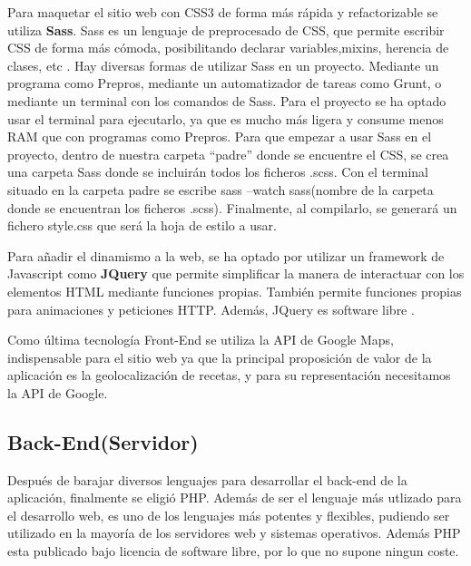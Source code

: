 \vspace{5 mm}

Para maquetar el sitio web con CSS3 de forma más rápida y refactorizable se utiliza \textbf{Sass}. Sass es un lenguaje de preprocesado de CSS, que permite
escribir CSS de forma más cómoda, posibilitando declarar variables,mixins, herencia de clases, etc \cite{sass-doc}. Hay diversas formas de utilizar Sass
en un proyecto. Mediante un programa como Prepros, mediante un automatizador de tareas como Grunt, o mediante un terminal con los comandos de Sass.
Para el proyecto se ha optado usar el terminal para ejecutarlo, ya que es mucho más ligera y consume menos RAM que con programas como Prepros.
Para que empezar a usar Sass en el proyecto, dentro de nuestra carpeta ``padre'' donde se encuentre el CSS, se crea una carpeta Sass donde se incluirán
todos los ficheros .scss. Con el terminal situado en la carpeta padre se escribe sass --watch sass(nombre de la carpeta donde se encuentran los ficheros
.scss). Finalmente, al compilarlo, se generará un fichero style.css que será la hoja de estilo a usar.

\vspace{5 mm}

Para añadir el dinamismo a la web, se ha optado por utilizar un framework de Javascript como \textbf{JQuery} que permite simplificar la manera de
interactuar con los elementos HTML mediante funciones propias. También permite funciones propias para animaciones y peticiones HTTP. Además, JQuery
es software libre \cite{jquery-doc}.

\vspace{5 mm}

Como última tecnología Front-End se utiliza la API de Google Maps, indispensable para el sitio web ya que la principal proposición de valor de la
aplicación es la geolocalización de recetas, y para su representación necesitamos la API de Google.


\subsection{Back-End(Servidor)}

Después de barajar diversos lenguajes para desarrollar el back-end de la aplicación, finalmente se eligió PHP. Además de ser el lenguaje más utlizado
para el desarrollo web, es uno de los lenguajes más potentes y flexibles, pudiendo ser utilizado en la mayoría de los servidores web y sistemas operativos.
Además PHP esta publicado bajo licencia de software libre, por lo que no supone ningun coste.


